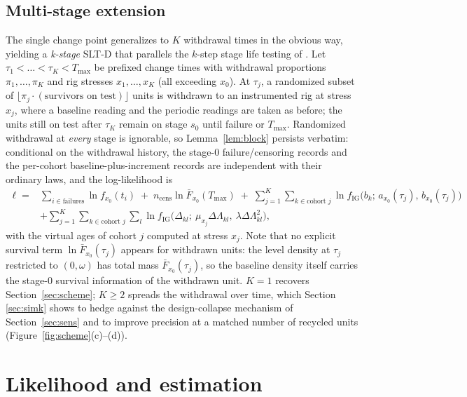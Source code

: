 \documentclass[11pt]{article}
\newcommand{\tmax}{T_{\max}}
\newcommand{\SLTD}{SLT-D}
\begin{document}
\subsection{Multi-stage extension}\label{sec:kstage}

The single change point generalizes to $K$ withdrawal times in the obvious way, yielding a
\emph{k-stage} \SLTD{} that parallels the $k$-step stage life testing of
\citet{LaumenCramer2021}. Let $\tau_1<\dots<\tau_K<\tmax$ be prefixed change times with
withdrawal proportions $\pi_1,\dots,\pi_K$ and rig stresses $x_1,\dots,x_K$ (all exceeding
$x_0$). At $\tau_j$, a randomized subset of $\lfloor\pi_j\cdot(\text{survivors on test})\rfloor$
units is withdrawn to an instrumented rig at stress $x_j$, where a baseline reading and the
periodic readings are taken as before; the units still on test after $\tau_K$ remain on stage
$s_0$ until failure or $\tmax$. Randomized withdrawal at \emph{every} stage is ignorable, so
Lemma~\ref{lem:block} persists verbatim: conditional on the withdrawal history, the stage-$0$
failure/censoring records and the per-cohort baseline-plus-increment records are independent
with their ordinary laws, and the log-likelihood is
\begin{equation}\label{eq:ellk}
\begin{split}
\ell ={}&\sum_{i\in\text{failures}}\ln f_{x_0}(t_i)\;+\;n_{\mathrm{cens}}\ln\bar F_{x_0}(\tmax)
\;+\;\sum_{j=1}^{K}\sum_{k\in\text{cohort }j}
\ln f_{\mathrm{IG}}\big(b_k;\,a_{x_0}(\tau_j),\,b_{x_0}(\tau_j)\big)\\
&+\sum_{j=1}^{K}\sum_{k\in\text{cohort }j}\sum_{l}
\ln f_{\mathrm{IG}}\big(\Delta_{kl};\ \mu_{x_j}\Delta\Lambda_{kl},\ \lambda\Delta\Lambda_{kl}^{2}\big),
\end{split}
\end{equation}
with the virtual ages of cohort $j$ computed at stress $x_j$. Note that no explicit survival
term $\ln\bar F_{x_0}(\tau_j)$ appears for withdrawn units: the level density at $\tau_j$
restricted to $(0,\omega)$ has total mass $\bar F_{x_0}(\tau_j)$, so the baseline density
itself carries the stage-$0$ survival information of the withdrawn unit. $K=1$ recovers
Section~\ref{sec:scheme}; $K\ge2$ spreads the withdrawal over time, which Section
\ref{sec:simk} shows to hedge against the design-collapse mechanism of
Section~\ref{sec:sens} and to improve precision at a matched number of recycled units
(Figure~\ref{fig:scheme}(c)--(d)).

\section{Likelihood and estimation}\label{sec:lik}
\end{document}
